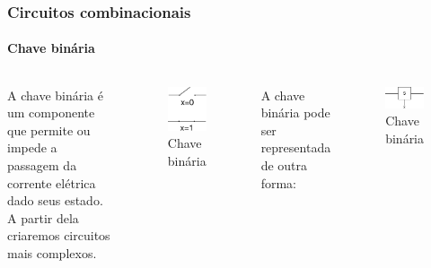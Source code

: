 \begin{frame}
	\frametitle{Circuitos combinacionais}
	\framesubtitle{Chave binária}
	\begin{columns}
		\par A chave binária é um componente que permite ou impede a passagem da corrente elétrica dado seus estado. A partir dela criaremos circuitos mais complexos.
		\begin{figure}
			\centering
			\includegraphics[width=0.2\linewidth]{images/chaveBinaria}
			\caption{Chave binária}
			\label{fig:chavebinaria}
		\end{figure}
		\par A chave binária pode ser representada de outra forma:
		\begin{figure}
			\centering
			\includegraphics[width=0.7\linewidth]{images/chaveBinariaAbstrata}
			\caption{Chave binária}
			\label{fig:chavebinariaabstrata}
		\end{figure}
	\end{columns}
\end{frame}


